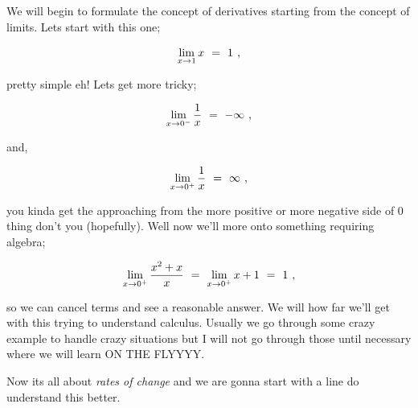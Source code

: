 \documentclass{article}
\newcounter{subsubsubsection}[subsubsection]
\begin{document}
We will begin to formulate the concept of derivatives starting from the concept of limits. Lets start with this one;

\begin{equation} \label{eb-eq-301-1} 
\lim_{x\to1} x \hspace{0.125cm} = \hspace{0.125cm} 1 \hspace{0.125cm} ,
\end{equation}

pretty simple eh! Lets get more tricky;

\begin{equation} \label{eb-eq-302-1} 
\lim_{x\to0^{-}} \frac{1}{x} \hspace{0.125cm} = \hspace{0.125cm} -\infty \hspace{0.125cm} ,
\end{equation}

and,

\begin{equation} \label{eb-eq-303-1} 
\lim_{x\to0^{+}} \frac{1}{x} \hspace{0.125cm} = \hspace{0.125cm} \infty \hspace{0.125cm} ,
\end{equation}

you kinda get the approaching from the more positive or more negative side of \begin{math} 0 \end{math} thing don't you (hopefully). Well now we'll more onto something requiring algebra;

\begin{equation} \label{eb-eq-304-1} 
\lim_{x\to0^{+}} \frac{x^2 + x}{x} \hspace{0.125cm} = \hspace{0.125cm} \lim_{x\to0^{+}} x + 1 \hspace{0.125cm} = \hspace{0.125cm} 1  \hspace{0.125cm} ,
\end{equation}

so we can cancel terms and see a reasonable answer. We will how far we'll get with this trying to understand calculus. Usually we go through some crazy example to handle crazy situations but I will not go through those until necessary where we will learn ON THE FLYYYY.

Now its all about \textit{rates of change} and we are gonna start with a line do understand this better. \\
\end{document}
